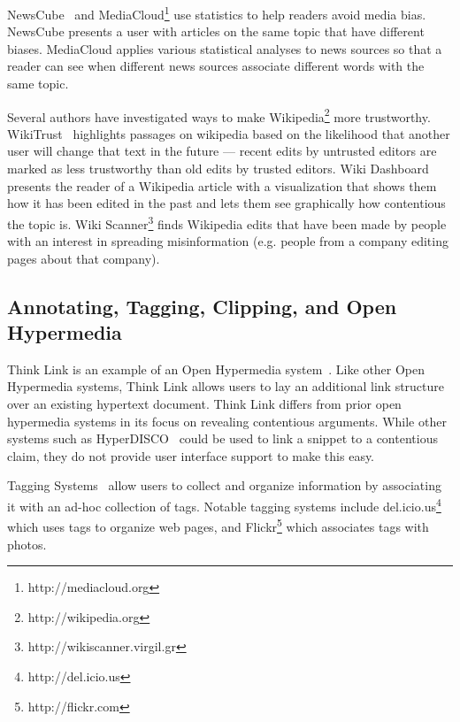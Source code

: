 \documentclass{chi2009}
\newcommand{\todo}[1]{}
\begin{document}
NewsCube~\cite{Park2009} and MediaCloud\footnote{http://mediacloud.org} use statistics to help readers avoid media bias. NewsCube presents a user with articles on the same topic that have different biases. MediaCloud applies various statistical analyses to news sources so that a reader can see when different news sources associate different words with the same topic.

Several authors have investigated ways to make Wikipedia\footnote{http://wikipedia.org} more trustworthy. WikiTrust~\cite{Adler2008a} highlights passages on wikipedia based on the likelihood that another user will change that text in the future --- recent edits by untrusted editors are marked as less trustworthy than old edits by trusted editors. Wiki Dashboard~\cite{Kittur2008} presents the reader of a Wikipedia article with a visualization that shows them how it has been edited in the past and lets them see graphically how contentious the topic is. Wiki Scanner\footnote{http://wikiscanner.virgil.gr} finds Wikipedia edits that have been made by people with an interest in spreading misinformation (e.g. people from a company editing pages about that company).

% 
% 

\subsection{Annotating, Tagging, Clipping, and Open Hypermedia}

Think Link is an example of an Open Hypermedia system~\cite{Bouvin2000}. Like other Open Hypermedia systems, Think Link allows users to lay an additional link structure over an existing hypertext document. Think Link differs from prior open hypermedia systems in its focus on revealing contentious arguments. While other systems such as HyperDISCO~\cite{Wiil1996} could be used to link a snippet to a contentious claim, they do not provide user interface support to make this easy.

\todo{Say how different from other Open Hypermedia link annotation systems}

Tagging Systems~\cite{Marlow2006,Golder2006} allow users to collect and organize information by associating it with an ad-hoc collection of tags. Notable tagging systems include del.icio.us\footnote{http://del.icio.us} which uses tags to organize web pages, and Flickr\footnote{http://flickr.com} which associates tags with photos. 
\end{document}
